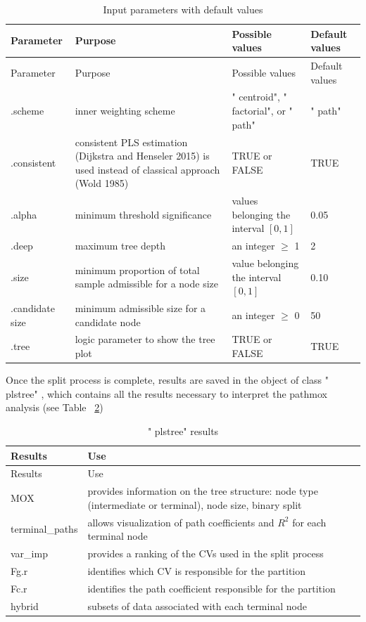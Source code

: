\hypertarget{par_imp}{}
\begin{longtable}[]{@{}llll@{}}
\caption{Input parameters with default values}\tabularnewline
\toprule\noalign{}
Parameter & Purpose & Possible values & Default values \\
\midrule\noalign{}
\endfirsthead
\toprule\noalign{}
Parameter & Purpose & Possible values & Default values \\
\midrule\noalign{}
\endhead
\bottomrule\noalign{}
\endlastfoot
.scheme & inner weighting scheme & " centroid", " factorial", or " path" & " path" \\
.consistent & consistent PLS estimation (Dijkstra and Henseler 2015) is used instead of classical approach (Wold 1985) & TRUE or FALSE & TRUE \\
.alpha & minimum threshold significance & values belonging the interval \([0,1]\) & 0.05 \\
.deep & maximum tree depth & an integer \(\geq\) 1 & 2 \\
.size & minimum proportion of total sample admissible for a node size & value belonging the interval \([0,1]\) & 0.10 \\
.candidate size & minimum admissible size for a candidate node & an integer \(\geq\) 0 & 50 \\
.tree & logic parameter to show the tree plot & TRUE or FALSE & TRUE \\
\end{longtable}

Once the split process is complete, results are saved in the object of
class " plstree" , which contains all the results necessary to
interpret the pathmox analysis (see Table
~\protect\hyperlink{output}{2})

\hypertarget{output}{}
\begin{longtable}[]{@{}ll@{}}
\caption{" plstree" results}\tabularnewline
\toprule\noalign{}
Results & Use \\
\midrule\noalign{}
\endfirsthead
\toprule\noalign{}
Results & Use \\
\midrule\noalign{}
\endhead
\bottomrule\noalign{}
\endlastfoot
MOX & provides information on the tree structure: node type (intermediate or terminal), node size, binary split \\
terminal\_paths & allows visualization of path coefficients and \(R^2\) for each terminal node \\
var\_imp & provides a ranking of the CVs used in the split process \\
Fg.r & identifies which CV is responsible for the partition \\
Fc.r & identifies the path coefficient responsible for the partition \\
hybrid & subsets of data associated with each terminal node \\
\end{longtable}

